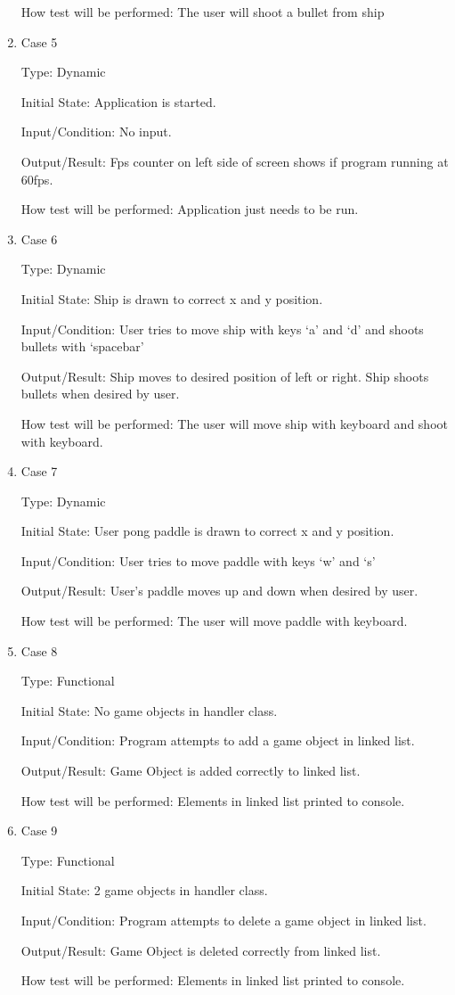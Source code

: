 \documentclass[12pt, titlepage]{article}
\begin{document}
\begin{enumerate}
How test will be performed: The user will shoot a bullet from ship

\item{Case 5\\}

Type: Dynamic

Initial State: Application is started.

Input/Condition: No input.

Output/Result: Fps counter on left side of screen shows if program running at 60fps.

How test will be performed: Application just needs to be run.

\item{Case 6\\}

Type: Dynamic

Initial State: Ship is drawn to correct x and y position.

Input/Condition: User tries to move ship with keys ‘a’ and ‘d’ and shoots bullets with ‘spacebar’

Output/Result: Ship moves to desired position of left or right. Ship shoots bullets when desired by user. 

How test will be performed: The user will move ship with keyboard and shoot with keyboard.

\item{Case 7\\}

Type: Dynamic

Initial State: User pong paddle is drawn to correct x and y position.

Input/Condition: User tries to move paddle with keys ‘w’ and ‘s’ 

Output/Result: User’s paddle moves up and down when desired by user.

How test will be performed: The user will move paddle with keyboard.

\item{Case 8\\}

Type: Functional

Initial State: No game objects in handler class.

Input/Condition: Program attempts to add a game object in linked list.

Output/Result: Game Object is added correctly to linked list.

How test will be performed: Elements in linked list printed to console.

\item{Case 9\\}

Type: Functional

Initial State: 2 game objects in handler class.

Input/Condition: Program attempts to delete a game object in linked list.

Output/Result: Game Object is deleted correctly from linked list.

How test will be performed: Elements in linked list printed to console.

\end{enumerate}
		
\end{document}
